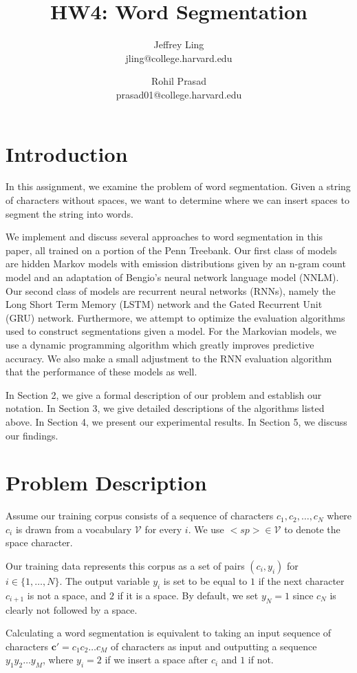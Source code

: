 \documentclass[11pt]{article}
\title{HW4: Word Segmentation}
\author{Jeffrey Ling \\ jling@college.harvard.edu \and Rohil Prasad \\ prasad01@college.harvard.edu }
\begin{document}
\maketitle{}
\section{Introduction}

In this assignment, we examine the problem of word segmentation. Given a string of characters without spaces, we want to determine where we can insert spaces to segment the string into words. 

We implement and discuss several approaches to word segmentation in this paper, all trained on a portion of the Penn Treebank. Our first class of models are hidden Markov models with emission distributions given by an n-gram count model and an adaptation of Bengio's neural network language model (NNLM). Our second class of models are recurrent neural networks (RNNs), namely the Long Short Term Memory (LSTM) network and the Gated Recurrent Unit (GRU) network. Furthermore, we attempt to optimize the evaluation algorithms used to construct segmentations given a model. For the Markovian models, we use a dynamic programming algorithm which greatly improves predictive accuracy. We also make a small adjustment to the RNN evaluation algorithm that the performance of these models as well. 

In Section 2, we give a formal description of our problem and establish our notation. In Section 3, we give detailed descriptions of the algorithms listed above. In Section 4, we present our experimental results. In Section 5, we discuss our findings.

\section{Problem Description}

Assume our training corpus consists of a sequence of characters $c_1, c_2, \dots, c_N$ where $c_i$ is drawn from a vocabulary $\mathcal{V}$ for every $i$. We use $<sp> \in \mathcal{V}$ to denote the space character. 

Our training data represents this corpus as a set of pairs $(c_i, y_i)$ for $i \in \{1, \dots, N\}$. The output variable $y_i$ is set to be equal to $1$ if the next character $c_{i+1}$ is not a space, and $2$ if it is a space. By default, we set $y_N = 1$ since $c_N$ is clearly not followed by a space. 

Calculating a word segmentation is equivalent to taking an input sequence of characters $\mathbf{c}' = c_1c_2\dots c_M$ of characters as input and outputting a sequence $y_1y_2\dots y_M$, where $y_i = 2$ if we insert a space after $c_i$ and $1$ if not. 
\end{document}
